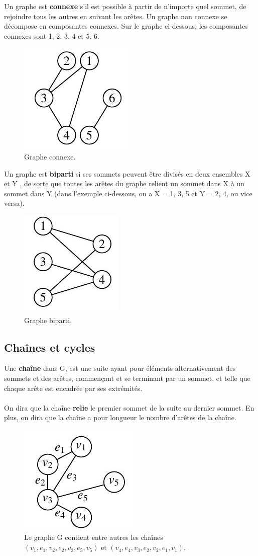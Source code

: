 Un graphe est \textbf{connexe} s'il est possible à partir de n'importe quel sommet,
de rejoindre tous les autres en suivant les arêtes. Un graphe non connexe se décompose en composantes
connexes. Sur le graphe ci-dessous, les composantes connexes sont {1, 2, 3, 4} et {5, 6}.
 
\begin{figure}[h]
\centering
\includegraphics[width=0.2\linewidth]{images/graph4}
\caption[Graphe connexe.]{Graphe connexe.}
\label{fig:graph4}
\end{figure}

Un graphe est \textbf{biparti} si ses sommets peuvent être divisés en deux ensembles X et Y ,
de sorte que toutes les arêtes du graphe relient un sommet dans X à un sommet dans Y
(dans l'exemple ci-dessous, on a X = {1, 3, 5} et Y = {2, 4}, ou vice versa).

\begin{figure}[h]
\centering
\includegraphics[width=0.2\linewidth]{images/graph5}
\caption[Graphe biparti.]{Graphe biparti.}
\label{fig:graph5}
\end{figure}

\newpage
\subsection{Chaînes et cycles}
\noindent Une \textbf{chaîne} dans G, est une suite ayant pour éléments alternativement des sommets et des
arêtes, commençant et se terminant par un sommet, et telle que chaque arête est encadrée
par ses extrémités.
\paragraph*{}
\noindent On dira que la chaîne \textbf{relie} le premier sommet de la suite au dernier sommet. En plus, on
dira que la chaîne a pour longueur le nombre d'arêtes de la chaîne.

\begin{figure}[h]
\centering
\includegraphics[width=0.2\linewidth]{images/graph6}
\caption[Chaîne.]{Le graphe G contient entre autres les chaînes $ (v_{1} , e_{1} , v_{2} , e_{2} , v_{3} , e_{5} , v_{5} ) $
	et $ (v_{4} , e_{4} , v_{3} , e_{2} , v_{2} , e_{1} , v_{1} ) $.}
\label{fig:graph6}
\end{figure}

